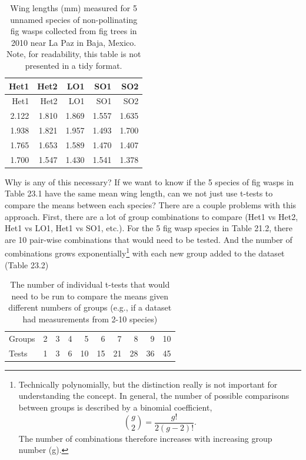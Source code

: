 \documentclass[
]{scrbook}
\begin{document}
\begin{longtable}[]{@{}rrrrr@{}}
\caption{\label{tab:unnamed-chunk-106}Wing lengths (mm) measured for 5 unnamed species of non-pollinating fig wasps collected from fig trees in 2010 near La Paz in Baja, Mexico. Note, for readability, this table is not presented in a tidy format.}\tabularnewline
\toprule
Het1 & Het2 & LO1 & SO1 & SO2 \\
\midrule
\endfirsthead
\toprule
Het1 & Het2 & LO1 & SO1 & SO2 \\
\midrule
\endhead
2.122 & 1.810 & 1.869 & 1.557 & 1.635 \\
1.938 & 1.821 & 1.957 & 1.493 & 1.700 \\
1.765 & 1.653 & 1.589 & 1.470 & 1.407 \\
1.700 & 1.547 & 1.430 & 1.541 & 1.378 \\
\bottomrule
\end{longtable}

Why is any of this necessary?
If we want to know if the 5 species of fig wasps in Table 23.1 have the same mean wing length, can we not just use t-tests to compare the means between each species?
There are a couple problems with this approach.
First, there are a lot of group combinations to compare (Het1 vs Het2, Het1 vs LO1, Het1 vs SO1, etc.).
For the 5 fig wasp species in Table 21.2, there are 10 pair-wise combinations that would need to be tested.
And the number of combinations grows exponentially\footnote{Technically polynomially, but the distinction really is not important for understanding the concept. In general, the number of possible comparisons between groups is described by a binomial coefficient, \[\binom{g}{2} = \frac{g!}{2\left(g - 2 \right)!}.\] The number of combinations therefore increases with increasing group number (g).} with each new group added to the dataset (Table 23.2)

\begin{longtable}[]{@{}lrrrrrrrrr@{}}
\caption{\label{tab:unnamed-chunk-107}The number of individual t-tests that would need to be run to compare the means given different numbers of groups (e.g., if a dataset had measurements from 2-10 species)}\tabularnewline
\toprule
\endhead
Groups & 2 & 3 & 4 & 5 & 6 & 7 & 8 & 9 & 10 \\
Tests & 1 & 3 & 6 & 10 & 15 & 21 & 28 & 36 & 45 \\
\bottomrule
\end{longtable}
\end{document}
